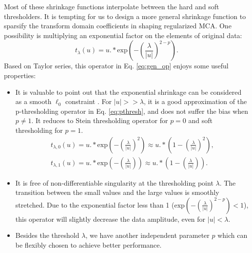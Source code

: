 Most of these shrinkage functions interpolate between the hard and soft thresholders. It is tempting for us to design a more general shrinkage function to sparsify the transform domain coefficients in shaping regularized MCA. One possibility is  multiplying an exponential factor on the elements of original data:
\begin{equation}\label{eq:gen_op}
t_{\lambda}(u)=u.*\mathrm{exp}(-(\frac{\lambda}{|u|})^{2-p}).
\end{equation}
Based on Taylor series, this operator in Eq. \eqref{eq:gen_op} enjoys some useful properties:
\begin{itemize}
 \item It is valuable to point out that the exponential shrinkage can be considered as a smooth $\ell_0$ constraint \citep{mohimani2009fast,gholami2011}.
For $|u|>>\lambda$, it is a good approximation of the p-thresholding operator in Eq. \eqref{eq:pthresh}, and does not suffer the bias when $p\neq 1$. It reduces to Stein thresholding operator for $p=0$ and soft thresholding for $p=1$. 
  \begin{equation}\label{eq:exp_sergey} 
  \begin{split}   
  t_{\lambda,0}(u)=u.*\mathrm{exp}(-(\frac{\lambda}{|u|})^{2})\approx u.*(1-(\frac{\lambda}{|u|})^{2}),\\
  t_{\lambda,1}(u)=u.*\mathrm{exp}(-(\frac{\lambda}{|u|}))\approx u.*(1-(\frac{\lambda}{|u|})).
  \end{split}
\end{equation}
 \item It is free of non-differentiable singularity at the thresholding point $\lambda$. The transition between the small values and the large values is smoothly stretched. Due to the exponential factor less than 1 ($\mathrm{exp}(-(\frac{\lambda}{|u|})^{2-p})<1$), this operator will slightly decrease the data amplitude, even for $|u|<\lambda$.
 \item Besides the threshold $\lambda$, we have another independent parameter $p$ which can be flexibly chosen to achieve better performance.
\end{itemize}

